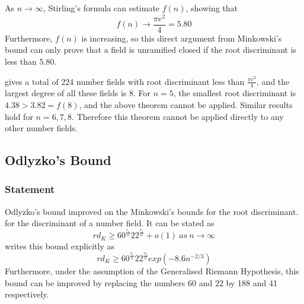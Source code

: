 \documentclass[12pt]{extarticle}
\newcommand{\<}{\langle}
\renewcommand{\>}{\rangle}
\theoremstyle{definition}
\begin{document}
As $n\rightarrow \infty$, Stirling's formula can estimate $f(n)$, showing that
\begin{equation}
    f(n) \longrightarrow \frac{\pi e^2}{4} = 5.80
\end{equation}
Furthermore, $f(n)$ is increasing, so this direct argument from Minkowski's bound can only prove that a field is unramified closed if the root discriminant is less than $5.80$. 

\cite{JONE2} gives a total of 224 number fields with root discriminant less than $ \frac{\pi e^2}{4}$, and the largest degree of all these fields is $8$. For $n=5$, the smallest root discriminant is $4.38 > 3.82 = f(8)$, and the above theorem cannot be applied. Similar results hold for $n = 6,7,8$. Therefore this theorem cannot be applied directly to any other number fields. 
\subsection{Odlyzko's Bound}
\subsubsection*{Statement}
Odlyzko's bound \cite{ODL1990} improved on the Minkowski's bounds for the root discriminant. for the discriminant of a number field. It can be stated as  
\begin{equation}
rd_K\geqslant 60^{\frac{r_1}{n}}22^{\frac{r_2}{n}}+o(1)\:as\:n\rightarrow \infty   
\end{equation}
\cite{MORENO} writes this bound explicitly as 
\begin{equation}
rd_K\geqslant 60^{\frac{r_1}{n}}22^{\frac{r_2}{n}}exp\left(-8.6n^{-2/3}\right)
\end{equation}
Furthermore, under the assumption of the Generalised Riemann Hypothesis, 
this bound can be improved by replacing the numbers 60 and 22 by 188 and 41 respectively. 
\end{document}
